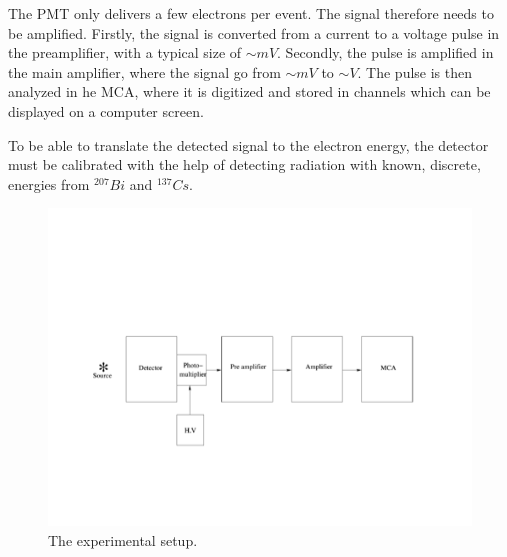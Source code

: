\documentclass[a4,11pt, notitlepage]{article}
\begin{document}
The PMT only delivers a few electrons per event. The signal therefore needs to be amplified. Firstly, the signal is converted from a current to a voltage pulse in the preamplifier, with a typical size of $\sim mV$. Secondly, the pulse is amplified in the main amplifier, where the signal go from $\sim mV$ to $\sim V$. The pulse is then analyzed in he MCA, where it is digitized and stored in channels which can be displayed on a computer screen. 

To be able to translate the detected signal to the electron energy, the detector must be calibrated with the help of detecting radiation with known, discrete, energies from $^{207}Bi$ and $^{137}Cs$.  

\begin{figure}[htp]
  \vspace{40pt}
  \begin{center}
    \includegraphics[width=15.0cm]{figures/Setup.png}
    \caption{The experimental setup.}
\label{fig:setup}
  \end{center}
\end{figure}
\end{document}

